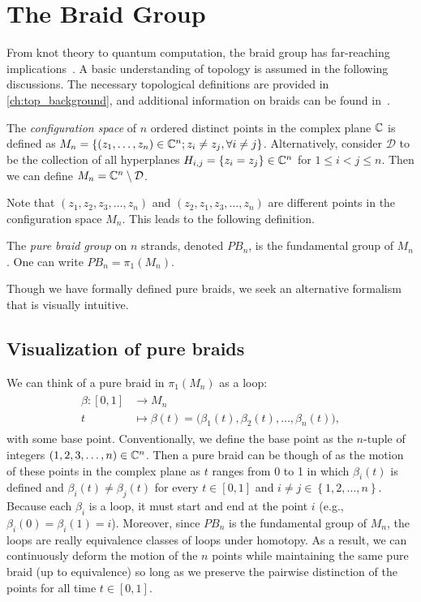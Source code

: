 \chapter{The Braid Group}\label{ch:braid_group}


From knot theory to quantum computation, the braid group has far-reaching implications~\cite{Artin1947,Date2003,Delaney2016,Deshmukh,Kassel2008,Khare2005}. A basic understanding of topology is assumed in the following discussions. The necessary topological definitions are provided in \cref{ch:top_background}, and additional information on braids can be found in~\cite{Artin1947,Kassel2008,Gonzalez2010,Rolfsen2010,Fulton1997}.
\begin{definition}
    The \textit{configuration space} of $n$ ordered distinct points in the complex plane $\mathbb{C}$ is defined as $M_n = \left\{ \left( z_1,\dots,z_n \right)\in\mathbb{C}^n ; z_i\neq z_j,\forall i\neq j \right\}$. Alternatively, consider $\mathcal{D}$ to be the collection of all hyperplanes $H_{i,j}=\left\{ z_i=z_j \right\}\in\mathbb{C}^n$ for $1\leq i < j \leq n$. Then we can define $M_n = \mathbb{C}^n \setminus \mathcal{D}$.
\end{definition}
Note that $\left( z_1,z_2,z_3,\dots,z_n \right)$ and $\left( z_2,z_1,z_3,\dots,z_n \right)$ are different points in the configuration space $M_n$. This leads to the following definition.
\begin{definition}
    The \textit{pure braid group} on $n$ strands, denoted $PB_n$, is the fundamental group of $M_n$. One can write $PB_n = \pi_1(M_n)$.
\end{definition}
Though we have formally defined pure braids, we seek an alternative formalism that is visually intuitive.

\section{Visualization of pure braids}

We can think of a pure braid in $\pi_1(M_n)$ as a loop:
\begin{align}
    \begin{split}
    \beta : \left[ 0,1 \right] &\to M_n \\
    t &\mapsto \beta(t) = \bigl( \beta_1(t),\beta_2(t),\dots,\beta_n(t) \bigr),
    \end{split}
\end{align}
with some base point. Conventionally, we define the base point as the $n$-tuple of integers $(1,2,3,\dots,n)\in \mathbb{C}^n$. Then a pure braid can be though of as the motion of these points in the complex plane as $t$ ranges from 0 to 1 in which $\beta_i(t)$ is defined and $\beta_i(t)\neq \beta_j(t)$ for every $t\in[0,1]$ and $i\neq j\in\left\{ 1,2,\dots,n \right\}$. Because each $\beta_i$ is a loop, it must start and end at the point $i$ (e.g., $\beta_i(0)=\beta_i(1)=i$). Moreover, since $PB_n$ is the fundamental group of $M_n$, the loops are really equivalence classes of loops under homotopy. As a result, we can continuously deform the motion of the $n$ points while maintaining the same pure braid (up to equivalence) so long as we preserve the pairwise distinction of the points for all time $t\in[0,1]$.

